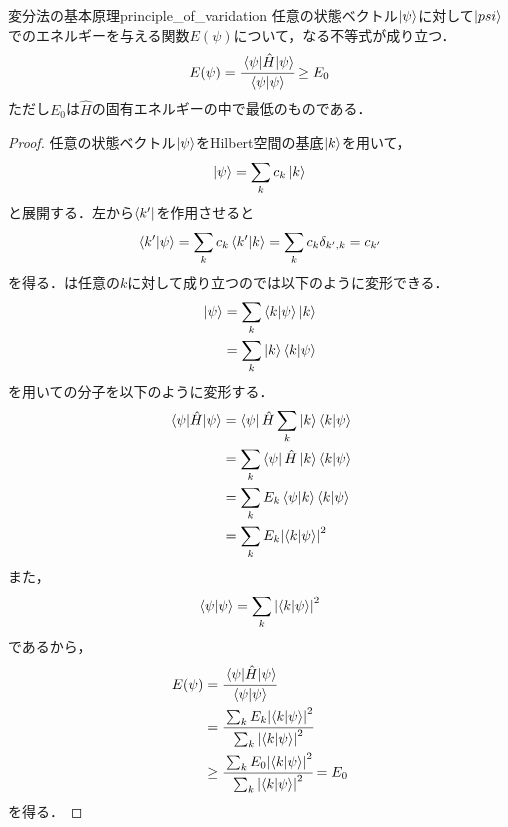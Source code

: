 \documentclass{report}
\begin{document}
  \begin{myprop}{変分法の基本原理}{principle_of_varidation}
    任意の状態ベクトル$\ket{\psi}$に対して$\ket{psi}$でのエネルギーを与える関数$E(\psi)$について，なる不等式が成り立つ．
    \begin{align}
      E(\psi) = \cfrac{\mel{\psi}{\hat{H}}{\psi}}{\braket{\psi}} \geq E_0 \label{minimum}
    \end{align}
    ただし$E_0$は$\hat{H}$の固有エネルギーの中で最低のものである．
    \tcblower
    \begin{proof}
      任意の状態ベクトル$\ket{\psi}$をHilbert空間の基底$\ket{k}$を用いて，
      \begin{align}
        \ket{\psi} = \sum_{k} c_k\ket{k} \label{basis_expansion}
      \end{align}
      と展開する．左から$\bra{k'}$を作用させると
      \begin{align}
        \braket{k'}{\psi} = \sum_{k}c_k\bra{k'}\ket{k} = \sum_{k}c_k\delta_{k',k} = c_{k'} \label{basis_expansion2}
      \end{align}
      を得る．は任意の$k$に対して成り立つのでは以下のように変形できる．
      \begin{align}
        \ket{\psi} &= \sum_{k}\braket{k}{\psi}\ket{k}\\
        &= \sum_{k}\ket{k}\bra{k}\ket{\psi} \label{basis_expansion3}
      \end{align}
      を用いての分子を以下のように変形する．
      \begin{align}
        \mel{\psi}{\hat{H}}{{\psi}} &= \bra{\psi}\hat{H}\sum_{k}\ket{k}\braket{k}{\psi}\\
        &= \sum_{k}\bra{\psi}\hat{H}\ket{k}\braket{k}{\psi} \\
        &= \sum_{k}E_k\bra{\psi}\ket{k}\braket{k}{\psi} \\
        &= \sum_{k}E_k\abs{\braket{k}{\psi}}^2
      \end{align}
      また，
      \begin{align}
        \braket{\psi}{\psi}=\sum_{k}\abs{\braket{k}{\psi}}^2
      \end{align}
      であるから，
      \begin{align}
        E(\psi) &= \cfrac{\mel{\psi}{\hat{H}}{\psi}}{\braket{\psi}{\psi} } \\ 
        &= \cfrac{\sum_{k}E_k\abs{\braket{k}{\psi}}^2}{\sum_{k}\abs{\braket{k}{\psi}}^2} \\ 
        &\geq \cfrac{\sum_{k}E_0\abs{\braket{k}{\psi}}^2}{\sum_{k}\abs{\braket{k}{\psi}}^2} = E_0
      \end{align}
      を得る．
    \end{proof}
  \end{myprop}
\end{document}
